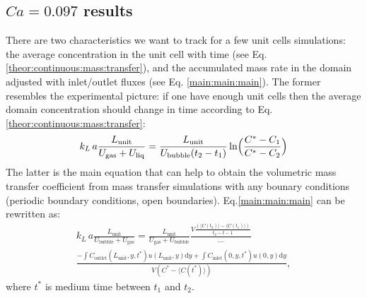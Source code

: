 \documentclass{article}
\newcommand{\beq}{\begin{equation}}
\newcommand{\feq}{\end{equation}}
\newcommand{\beqal}{\begin{equation}\begin{aligned}}
\newcommand{\feqal}{\end{aligned}\end{equation}}
\newcommand{\vol}{k_L\,a}
\newcommand{\lunit}{L_{\mathrm{unit}}}
\newcommand{\ububble}{U_{\mathrm{bubble}}}
\newcommand{\uliq}{U_{\mathrm{liq}}}
\newcommand{\ugas}{U_{\mathrm{gas}}}
\newcommand{\cinlet}{C_{\mathrm{inlet}}}
\newcommand{\coutlet}{C_{\mathrm{outlet}}}
\newcommand{\cstar}{C^{*}}
\newcommand{\volnondim}{\vol \frac{\lunit}{\ububble+\ugas}}
\begin{document}
\subsection{$Ca=0.097$ results}
There are two characteristics we want to track for a few unit cells simulations: the average
concentration in
the unit cell with time (see Eq. \ref{theor:continuous:mass:transfer}), and the accumulated mass
rate in the domain adjusted with inlet/outlet fluxes (see Eq. \ref{main:main:main}). The former
resembles the experimental picture: if one have enough unit cells then the average domain
concentration should change in time according to Eq. \ref{theor:continuous:mass:transfer}: 
\beq
\label{moving:average}
\vol\frac{\lunit}{\ugas+\uliq}=\frac{\lunit}{\ububble (t_2
-t_1)}\ln\Bigl(\frac{C^*-C_1}{C^*-C_2}\Bigr)
\feq
The
latter is the main equation that can help to obtain the volumetric mass transfer coefficient from
mass transfer simulations with any bounary conditions (periodic boundary conditions, open
boundaries). Eq.\ref{main:main:main} can be rewritten as:
\beq
\begin{aligned}
\volnondim=\frac{\lunit}{\ugas+\ububble} \frac{V \frac{(\langle C(t_2)\rangle - \langle C(t_1)
\rangle)}{t_2-t-1}}{\dots}\\
\frac{-\int{\coutlet(\lunit,y,t^*) u(\lunit,y) \mathrm{d} y}+\int{\cinlet(0,y,t^*)
u(0,y)\mathrm{d} y}}{V (\cstar - \langle C(t^*) \rangle)},
\end{aligned}
\feq
where $t^*$ is medium time between $t_1$ and $t_2$.
\end{document}
